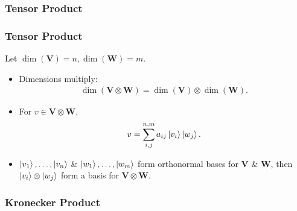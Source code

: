 \documentclass{beamer}
\theoremstyle{definition}
\newcommand{\V}{\mathbf{V}}
\newcommand{\W}{\mathbf{W}}
\begin{document}
\begin{frame}[fragile]
\frametitle{Tensor Product}	
\begin{centering}

\end{centering}
\end{frame}





\begin{frame}
\frametitle{Tensor Product}
Let $\dim(\V) = n, \dim(\W) = m$.
\begin{itemize}
	\item Dimensions multiply:
	\begin{align*}
	\dim(\V\otimes \W) = \dim(\V) \otimes \dim(\W).
	\end{align*}
	\item For $v \in \V \otimes \W$,
	\begin{align*}
	v = \sum^{n,m}_{i,j}a_{ij}\left\vert{v_i}\right\rangle\left\vert{w_j}\right\rangle.
	\end{align*}
	\item $\left\vert{v_1}\right\rangle,\dots,\left\vert{v_n}\right\rangle$ \& $\left\vert{w_1}\right\rangle,\dots,\left\vert{w_m}\right\rangle$ form orthonormal bases for $\V$ \& $\W$, then $\left\vert{v_i}\right\rangle\otimes \left\vert{w_j}\right\rangle$ form a basis for $\V\otimes \W$.
\end{itemize}




\end{frame}




\begin{frame}
\frametitle{Kronecker Product}

\end{frame}
\end{document}
